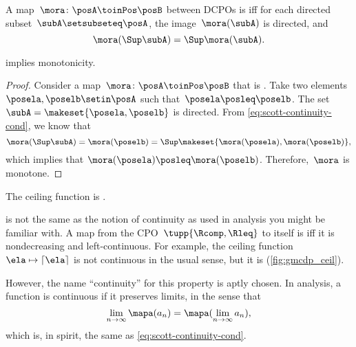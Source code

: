 \begin{definition}[\scottcontinuity]
    \label{def:scott}
    A map~$\mora\colon\posA\toinPos\posB$ between DCPOs is \emph{\scottcontinuous{}} iff for each directed subset~$\subA\setsubseteq\posA$, the image~$\mora(\subA)$ is directed, and
    \begin{equation}
        \label{eq:scott-continuity-cond}
        \mora(\Sup \subA)=\Sup \mora(\subA).
    \end{equation}
\end{definition}
\begin{lemma}
    \scottcontinuity implies monotonicity.
\end{lemma}
\begin{proof}
    Consider a map~$\mora\colon\posA\toinPos\posB$ that is \scottcontinuous.
    Take two elements~$\posela, \poselb \setin \posA$ such that~$\posela\posleq\poselb$.
    The set~$ \subA =  \makeset{\posela, \poselb}$ is directed.
    From \cref{eq:scott-continuity-cond}, we know that
    \begin{equation}
        \mora(\Sup \subA) = \mora(\poselb) = \Sup \makeset{\mora(\posela), \mora(\poselb)},
    \end{equation}
    which implies that $\mora(\posela) \posleq \mora(\poselb)$.
    Therefore,~$\mora$ is monotone.
\end{proof}

\begin{marginfigure}
    \caption{The ceiling function is \scottcontinuous.}
    \label{fig:gmcdp_ceil}
\end{marginfigure}

\begin{remark}
    \scottcontinuity is not the same as the notion of continuity as used in analysis you might be familiar with.
    A map from the CPO~$\tupp{\Rcomp,\Rleq}$ to itself is \scottcontinuous iff it is nondecreasing and left-continuous.
    For example, the ceiling function~$\ela \mapsto\left\lceil \ela\right\rceil $ is not continuous in the usual sense, but it is \scottcontinuous (\cref{fig:gmcdp_ceil}).

    However, the name ``continuity'' for this property is aptly chosen.
    In analysis, a function is continuous if it preserves limits, in the sense that
    \begin{equation}
        \lim_{n\to\infty}\mapa(a_n) = \mapa(\lim_{n\to\infty}a_n),
    \end{equation}
    which is, in spirit, the same as \cref{eq:scott-continuity-cond}.
\end{remark}

